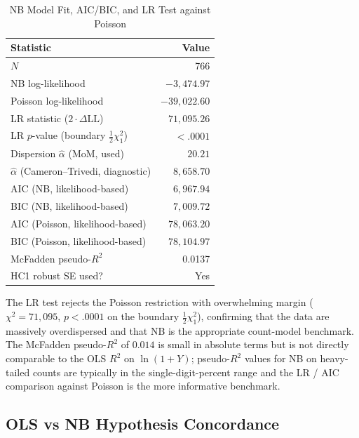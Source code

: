 \documentclass[12pt,a4paper]{article}
\begin{document}
\begin{table}[H]
\centering
\caption{NB Model Fit, AIC/BIC, and LR Test against Poisson}
\small
\begin{tabular}{lr}
\toprule
Statistic & Value \\
\midrule
$N$ & 766 \\
NB log-likelihood & $-3{,}474.97$ \\
Poisson log-likelihood & $-39{,}022.60$ \\
LR statistic ($2\cdot\Delta\text{LL}$) & $71{,}095.26$ \\
LR $p$-value (boundary $\tfrac12\chi^2_1$) & $<.0001$ \\
Dispersion $\hat\alpha$ (MoM, used) & $20.21$ \\
$\hat\alpha$ (Cameron--Trivedi, diagnostic) & $8{,}658.70$ \\
AIC (NB, likelihood-based) & $6{,}967.94$ \\
BIC (NB, likelihood-based) & $7{,}009.72$ \\
AIC (Poisson, likelihood-based) & $78{,}063.20$ \\
BIC (Poisson, likelihood-based) & $78{,}104.97$ \\
McFadden pseudo-$R^{2}$ & 0.0137 \\
HC1 robust SE used? & Yes \\
\bottomrule
\end{tabular}
\end{table}

The LR test rejects the Poisson restriction with overwhelming margin ($\chi^2 = 71{,}095$, $p<.0001$ on the boundary $\tfrac12 \chi^2_1$), confirming that the data are massively overdispersed and that NB is the appropriate count-model benchmark. The McFadden pseudo-$R^2$ of $0.014$ is small in absolute terms but is not directly comparable to the OLS $R^2$ on $\ln(1+Y)$; pseudo-$R^2$ values for NB on heavy-tailed counts are typically in the single-digit-percent range and the LR / AIC comparison against Poisson is the more informative benchmark.

\subsection{OLS vs NB Hypothesis Concordance}
\end{document}
